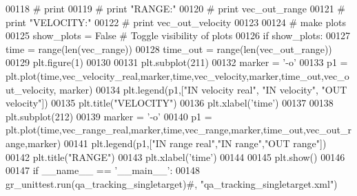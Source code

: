 \begin{DoxyCode}
00118 \textcolor{comment}{#               print }
00119 \textcolor{comment}{#       print "RANGE:"}
00120 \textcolor{comment}{#       print vec\_out\_range}
00121 \textcolor{comment}{#       print "VELOCITY:"}
00122 \textcolor{comment}{#       print vec\_out\_velocity}
00123         
00124         \textcolor{comment}{# make plots}
00125         show\_plots = \textcolor{keyword}{False} \textcolor{comment}{# Toggle visibility of plots}
00126         \textcolor{keywordflow}{if} show\_plots:
00127             time = range(len(vec\_range))
00128             time\_out = range(len(vec\_out\_range))
00129             plt.figure(1)
00130             
00131             plt.subplot(211)
00132             marker = \textcolor{stringliteral}{'-o'}
00133             p1 = plt.plot(time,vec\_velocity\_real,marker,time,vec\_velocity,marker,time\_out,vec\_out\_velocity,
      marker)
00134             plt.legend(p1,[\textcolor{stringliteral}{"IN velocity real"}, \textcolor{stringliteral}{"IN velocity"}, \textcolor{stringliteral}{"OUT velocity"}])
00135             plt.title(\textcolor{stringliteral}{"VELOCITY"})
00136             plt.xlabel(\textcolor{stringliteral}{'time'})
00137             
00138             plt.subplot(212)
00139             marker = \textcolor{stringliteral}{'-o'}
00140             p1 = plt.plot(time,vec\_range\_real,marker,time,vec\_range,marker,time\_out,vec\_out\_range,marker)
00141             plt.legend(p1,[\textcolor{stringliteral}{"IN range real"},\textcolor{stringliteral}{"IN range"},\textcolor{stringliteral}{"OUT range"}])
00142             plt.title(\textcolor{stringliteral}{"RANGE"})
00143             plt.xlabel(\textcolor{stringliteral}{'time'})
00144             
00145             plt.show()
00146 
00147 \textcolor{keywordflow}{if} \_\_name\_\_ == \textcolor{stringliteral}{'\_\_main\_\_'}:
00148     gr\_unittest.run(qa\_tracking\_singletarget)\textcolor{comment}{#, "qa\_tracking\_singletarget.xml")}
\end{DoxyCode}
